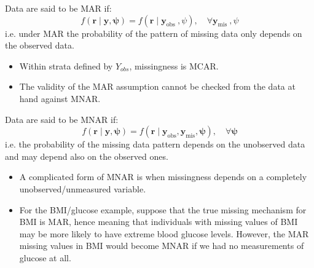 \documentclass[11pt]{article}
\theoremstyle{break}
\begin{document}
\begin{definition}[MAR]
    Data are said to be MAR if:
    \begin{equation}
f(\mathbf{r} \mid \mathbf{y}, \boldsymbol{\psi})=f\left(\mathbf{r} \mid \mathbf{y}_{\text {obs }}, \psi\right), \quad \forall \mathbf{y}_{\text {mis }}, \psi
\end{equation}
i.e. under MAR the probability of the pattern of missing data only depends on
the observed data.
\begin{itemize}
    \item Within strata defined by $Y_{obs}$, missingness is MCAR.
    \item The validity of the MAR assumption cannot be checked from the data
        at hand against MNAR.
    \end{itemize}
\end{definition}



\begin{definition}[MNAR]
    Data are said to be MNAR if:
    \begin{equation}
f(\mathbf{r} \mid \mathbf{y}, \boldsymbol{\psi})=f\left(\mathbf{r} \mid \mathbf{y}_{\mathrm{obs}}, \mathbf{y}_{\mathrm{mis}}, \boldsymbol{\psi}\right), \quad \forall \boldsymbol{\psi}
\end{equation}
i.e. the probability of the missing data pattern depends on the unobserved data
and may depend also on the observed ones.
\begin{itemize}
    \item A complicated form of MNAR is when missingness depends on a
        completely unobserved/unmeasured variable.
    \item For the BMI/glucose example, suppose that the true missing mechanism
        for BMI is MAR, hence meaning that individuals with missing values of
        BMI may be more likely to have extreme blood glucose levels.
        However, the MAR missing values in BMI would become MNAR if we had
        no measurements of glucose at all.

    \end{itemize}
\end{definition}
\end{document}
